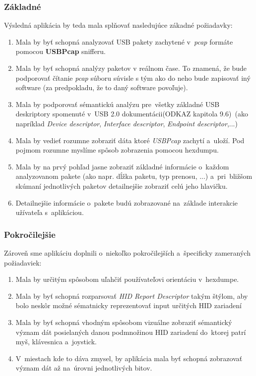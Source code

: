 \subsubsection*{Základné}

Výsledná aplikácia by teda mala splňovať nasledujúce zákadné požiadavky:

\begin{enumerate}[label=\textbf{P\arabic*}]
	\item \label{uvod:poz:analyza} Mala by byť schopná analyzovať USB pakety zachytené v~\textit{pcap} formáte pomocou \textbf{USBPcap} snifferu.
	\item \label{uvod:poz:analyza_real_time} Mala by byť schopná analýzy paketov v reálnom čase. To znamená, že bude podporovať čítanie \textit{pcap} súboru súvisle s tým ako do neho bude zapisovať iný software (za predpokladu, že to daný software povoľuje).
	\item \label{uvod:poz:deskriptory} Mala by podporovať sémantickú analýzu pre~všetky základné USB deskriptory spomenuté v~USB 2.0 dokumentácii(ODKAZ kapitola 9.6)~(ako napríklad \textit{Device descriptor}, \textit{Interface descriptor}, \textit{Endpoint descriptor},...)
	\item \label{uvod:poz:hexdump} Mala by vedieť rozumne zobraziť dáta ktoré \textit{USBPcap} zachytí a~uloží. Pod pojmom rozumne myslíme spôsob zobrazenia pomocou hexdumpu.
	\item \label{uvod:poz:zobrazenie_paketov} Mala by na prvý pohľad jasne zobraziť základné informácie o~každom analyzovanom pakete (ako napr. dĺžka paketu, typ prenosu, ...) a~pri~bližšom skúmaní jednotlivých paketov detailnejšie zobraziť celú jeho hlavičku.
	\item \label{uvod:poz:paket_detail} Detailnejšie informácie o~pakete budú zobrazované na~základe interakcie užívateľa s~aplikáciou.
\end{enumerate}

\subsubsection*{Pokročilejšie}

Zároveň sme aplikáciu doplnili o~niekoľko pokročilejších a~špecificky zameraných požiadaviek:

\begin{enumerate}[label=\textbf{P\arabic*},resume]
	\item \label{uvod:poz:data_highlight} Mala by určitým spôsobom uľahčiť používateľovi orientáciu v~hexdumpe.
	\item \label{uvod:poz:report_desk_parser} Mala by byť schopná rozparsovať \textit{HID Report Descriptor} takým štýlom, aby bolo neskôr možné sématnicky reprezentovať input určitých HID zariadení
	\item \label{uvod:poz:hid_analyza} Mala by byť schopná vhodným spôsobom vizuálne zobraziť sémantický význam dát posielaných danou podmnožinou HID zariadení do~ktorej patrí myš, klávesnica a~joystick.
	\item \label{uvod:poz:show_bits} V~miestach kde to dáva zmysel, by aplikácia mala byť schopná zobrazovať význam dát až na~úrovni jednotlivých bitov.
\end{enumerate}

